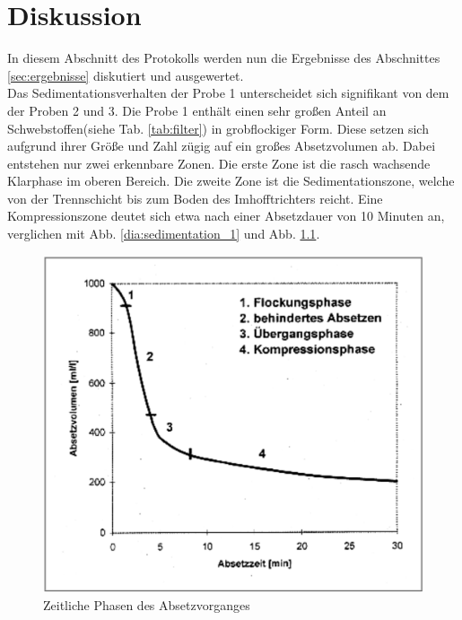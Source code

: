 \chapter{Diskussion}
\label{sec:diskussion}
In diesem Abschnitt des Protokolls werden nun die Ergebnisse des Abschnittes \ref{sec:ergebnisse} diskutiert und ausgewertet.\\


Das Sedimentationsverhalten der Probe 1 unterscheidet sich signifikant von dem der Proben 2 und 3. Die Probe 1 enthält einen sehr großen Anteil an Schwebstoffen\linebreak (siehe Tab. \ref{tab:filter}) in grobflockiger Form. Diese setzen sich aufgrund ihrer Größe und Zahl zügig auf ein großes Absetzvolumen ab. Dabei entstehen nur zwei erkennbare Zonen. Die erste Zone ist die rasch wachsende Klarphase im oberen Bereich. Die zweite Zone ist die Sedimentationszone, welche von der Trennschicht bis zum Boden des Imhofftrichters reicht. Eine Kompressionszone deutet sich etwa nach einer Absetzdauer von 10 Minuten an, verglichen mit Abb. \ref{dia:sedimentation_1} und Abb. \ref{fig:Absetzphasen-merkel1971}.\\
 \begin{figure}[h!]
\centering
\includegraphics[width=0.6\linewidth]{img/Absetzphasen_merkel1971}
\caption[Zeitliche Phasen des Absetzvorganges]{Zeitliche Phasen des Absetzvorganges \cite{merkel1971untersuchungen}}
\label{fig:Absetzphasen-merkel1971}
\end{figure}
\FloatBarrier



